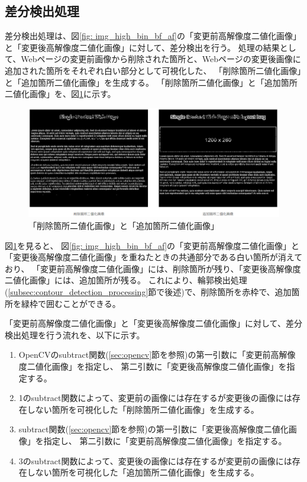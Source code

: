 \subsection{差分検出処理}\label{subsec:difference_detection_process}
差分検出処理は、図\ref{fig: img_high_bin_bf_af}の「変更前高解像度二値化画像」と「変更後高解像度二値化画像」に対して、差分検出を行う。
処理の結果として、Webページの変更前画像から削除された箇所と、Webページの変更後画像に追加された箇所をそれぞれ白い部分として可視化した、
「削除箇所二値化画像」と「追加箇所二値化画像」を生成する。
「削除箇所二値化画像」と「追加箇所二値化画像」を、図\ref{fig: img_del_add_bin_bf_af}に示す。
\begin{figure}[tp]
    \begin{center}
        \includegraphics[width=1.0\columnwidth]{image/4_img_del_add_bin_bf_af.png}
        \caption{「削除箇所二値化画像」と「追加箇所二値化画像」}
        \label{fig: img_del_add_bin_bf_af}
    \end{center}
\end{figure}
図\ref{fig: img_del_add_bin_bf_af}を見ると、
図\ref{fig: img_high_bin_bf_af}の「変更前高解像度二値化画像」と「変更後高解像度二値化画像」を重ねたときの共通部分である白い箇所が消えており、
「変更前高解像度二値化画像」には、削除箇所が残り、「変更後高解像度二値化画像」には、追加箇所が残る。
これにより、輪郭検出処理(\ref{subsec:contour_detection_processing}節で後述)で、削除箇所を赤枠で、追加箇所を緑枠で囲むことができる。
\par
「変更前高解像度二値化画像」と「変更後高解像度二値化画像」に対して、差分検出処理を行う流れを、以下に示す。
\begin{enumerate}
    \item OpenCVのsubtract関数(\ref{sec:opencv}節を参照)の第一引数に「変更前高解像度二値化画像」を指定し、
          第二引数に「変更後高解像度二値化画像」を指定する。
    \item 1のsubtract関数によって、変更前の画像には存在するが変更後の画像には存在しない箇所を可視化した「削除箇所二値化画像」を生成する。
    \item subtract関数(\ref{sec:opencv}節を参照)の第一引数に「変更後高解像度二値化画像」を指定し、
          第二引数に「変更前高解像度二値化画像」を指定する。
    \item 3のsubtract関数によって、変更後の画像には存在するが変更前の画像には存在しない箇所を可視化した「追加箇所二値化画像」を生成する。
\end{enumerate}

